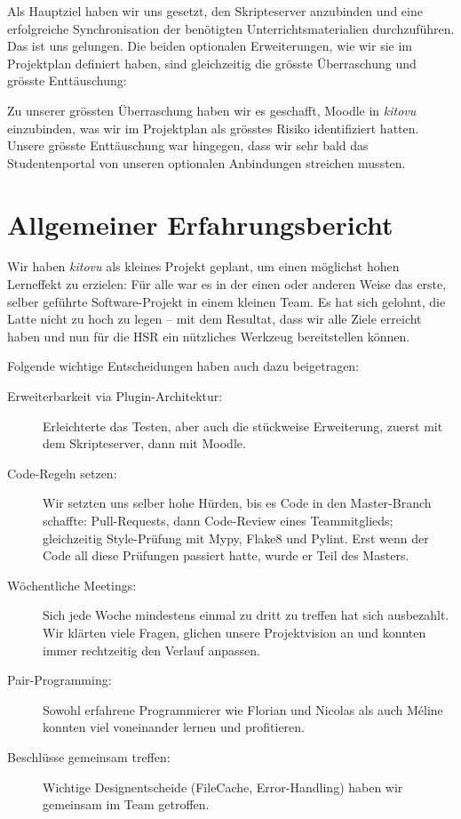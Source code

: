 \documentclass[a4paper]{article}
\let\oldsection\section
\renewcommand\section{\clearpage\oldsection}
\begin{document}
Als Hauptziel haben wir uns gesetzt, den Skripteserver anzubinden und eine erfolgreiche Synchronisation der benötigten Unterrichtsmaterialien durchzuführen. Das ist uns gelungen. Die beiden optionalen Erweiterungen, wie wir sie im Projektplan definiert haben, sind gleichzeitig die grösste Überraschung und grösste Enttäuschung:

Zu unserer grössten Überraschung haben wir es geschafft, Moodle in \emph{kitovu} einzubinden, was wir im Projektplan als grösstes Risiko identifiziert hatten. Unsere grösste Enttäuschung war hingegen, dass wir sehr bald das Studentenportal von unseren optionalen Anbindungen streichen mussten.

\section{Allgemeiner Erfahrungsbericht}

Wir haben \emph{kitovu} als kleines Projekt geplant, um einen möglichst hohen Lerneffekt zu erzielen: Für alle war es in der einen oder anderen Weise das erste, selber geführte Software-Projekt in einem kleinen Team. Es hat sich gelohnt, die Latte nicht zu hoch zu legen -- mit dem Resultat, dass wir alle Ziele erreicht haben und nun für die HSR ein nützliches Werkzeug bereitstellen können.

Folgende wichtige Entscheidungen haben auch dazu beigetragen:
\begin{description}
  \item[Erweiterbarkeit via Plugin-Architektur:] Erleichterte das Testen, aber auch die stückweise Erweiterung, zuerst mit dem Skripteserver, dann mit Moodle.
  \item[Code-Regeln setzen:] Wir setzten uns selber hohe Hürden, bis es Code in den Master-Branch schaffte: Pull-Requests, dann Code-Review eines Teammitglieds; gleichzeitig  Style-Prüfung mit Mypy, Flake8 und Pylint. Erst wenn der Code all diese Prüfungen passiert hatte, wurde er Teil des Masters.
  \item [Wöchentliche Meetings:] Sich jede Woche mindestens einmal zu dritt zu treffen hat sich ausbezahlt. Wir klärten viele Fragen, glichen unsere Projektvision an und konnten immer rechtzeitig den Verlauf anpassen.
  \item[Pair-Programming:] Sowohl erfahrene Programmierer wie Florian und Nicolas als auch Méline konnten viel voneinander lernen und profitieren.
  \item[Beschlüsse gemeinsam treffen:] Wichtige Designentscheide (FileCache, Error-Handling) haben wir gemeinsam im Team getroffen.
\end{description}
\end{document}
